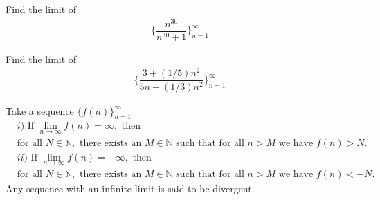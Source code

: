 \begin{exercise}
Find the limit of 
\begin{align*}
    \Big\{\dfrac{n^{30}}{n^{30}+1}\Big\}_{n=1}^{\infty}
\end{align*}
\end{exercise}

\begin{exercise}
Find the limit of 
\begin{align*}
    \Big\{\dfrac{3+(1/5)n^{2}}{5n+(1/3)n^{2}}\Big\}_{n=1}^{\infty}
\end{align*}
\end{exercise}

\begin{definition}
Take a sequence $\{f(n)\}_{n=1}^{\infty}$ 
\begin{align*}
    &i) \hspace{4pt} \text{If} \hspace{4pt} \lim_{n \longrightarrow \infty} f(n) = \infty, \hspace{4pt} \text{then}\\[1ex]
    &\text{for all} \hspace{4pt} N \in \mathbb{N}, \hspace{4pt} \text{there exists an} \hspace{4pt} M \in \mathbb{N} \hspace{4pt} \text{such that for all} \hspace{4pt} n > M \hspace{4pt} \text{we have} \hspace{4pt} f(n) > N. \\[6ex]
    &ii) \hspace{4pt} \text{If} \hspace{4pt} \lim_{n \longrightarrow \infty} f(n) = -\infty, \hspace{4pt} \text{then}\\[1ex]
    &\text{for all} \hspace{4pt} N \in \mathbb{N}, \hspace{4pt} \text{there exists an} \hspace{4pt} M \in \mathbb{N} \hspace{4pt} \text{such that for all} \hspace{4pt} n > M \hspace{4pt} \text{we have} \hspace{4pt} f(n) < -N.
\end{align*}
Any sequence with an infinite limit is said to be divergent.
\label{definition_infinite_limit_sequence}
\end{definition}

